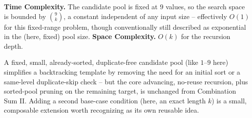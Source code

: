 \begin{complexitybox}
\textbf{Time Complexity.} The candidate pool is fixed at $9$ values, so
the search space is bounded by $\binom{9}{k}$, a constant independent of
any input size -- effectively $O(1)$ for this fixed-range problem, though
conventionally still described as exponential in the (here, fixed)
pool size.
\textbf{Space Complexity.} $O(k)$ for the recursion depth.
\end{complexitybox}

\begin{takeawaybox}
A fixed, small, already-sorted, duplicate-free candidate pool (like
$1$--$9$ here) simplifies a backtracking template by removing the need
for an initial sort or a same-level duplicate-skip check -- but the core
advancing, no-reuse recursion, plus sorted-pool pruning on the
remaining target, is unchanged from Combination Sum II. Adding a second
base-case condition (here, an exact length $k$) is a small, composable
extension worth recognizing as its own reusable idea.
\end{takeawaybox}
